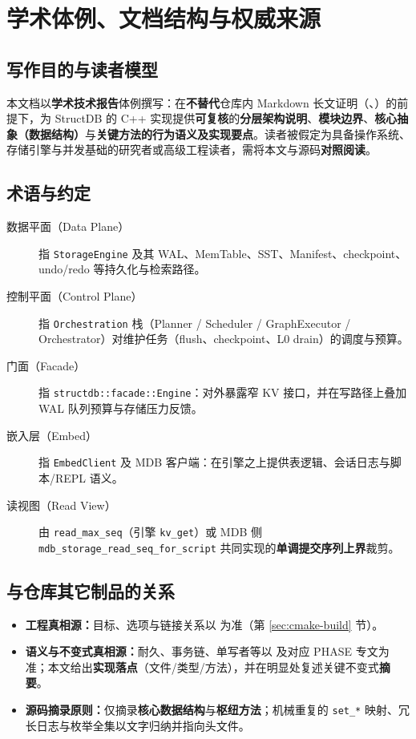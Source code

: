 \section{学术体例、文档结构与权威来源}
\label{sec:doc-academic}

\subsection{写作目的与读者模型}

本文档以\textbf{学术技术报告}体例撰写：在\textbf{不替代}仓库内 Markdown 长文证明（、）的前提下，为 StructDB 的 C++ 实现提供\textbf{可复核}的\textbf{分层架构说明}、\textbf{模块边界}、\textbf{核心抽象（数据结构）}与\textbf{关键方法的行为语义及实现要点}。读者被假定为具备操作系统、存储引擎与并发基础的研究者或高级工程读者，需将本文与源码\textbf{对照阅读}。

\subsection{术语与约定}

\begin{description}
  \item[数据平面（Data Plane）] 指 \texttt{StorageEngine} 及其 WAL、MemTable、SST、Manifest、checkpoint、undo/redo 等持久化与检索路径。
  \item[控制平面（Control Plane）] 指 \texttt{Orchestration} 栈（Planner / Scheduler / GraphExecutor / Orchestrator）对维护任务（flush、checkpoint、L0 drain）的调度与预算。
  \item[门面（Facade）] 指 \texttt{structdb::facade::Engine}：对外暴露窄 KV 接口，并在写路径上叠加 WAL 队列预算与存储压力反馈。
  \item[嵌入层（Embed）] 指 \texttt{EmbedClient} 及 MDB 客户端：在引擎之上提供表逻辑、会话日志与脚本/REPL 语义。
  \item[读视图（Read View）] 由 \texttt{read\_max\_seq}（引擎 \texttt{kv\_get}）或 MDB 侧 \texttt{mdb\_storage\_read\_seq\_for\_script} 共同实现的\textbf{单调提交序列上界}裁剪。
\end{description}

\subsection{与仓库其它制品的关系}

\begin{itemize}
  \item \textbf{工程真相源：}目标、选项与链接关系以  为准（第 \ref{sec:cmake-build} 节）。
  \item \textbf{语义与不变式真相源：}耐久、事务链、单写者等以  及对应 PHASE 专文为准；本文给出\textbf{实现落点}（文件/类型/方法），并在明显处复述关键不变式\textbf{摘要}。
  \item \textbf{源码摘录原则：}仅摘录\textbf{核心数据结构}与\textbf{枢纽方法}；机械重复的 \texttt{set\_*} 映射、冗长日志与枚举全集以文字归纳并指向头文件。
\end{itemize}

